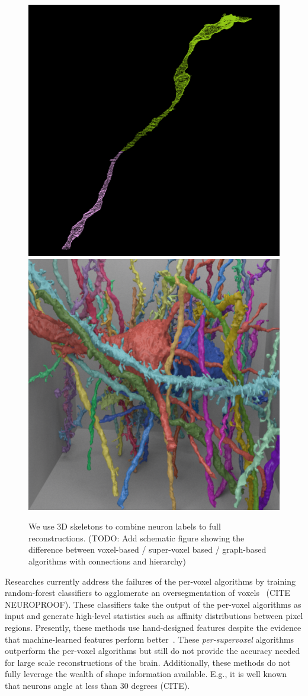 \begin{figure}
	\centering
	\includegraphics[width=0.42\linewidth]{./figures/merge_candidate1.png}
	\hspace{0.085\linewidth}
	\includegraphics[width=0.42\linewidth]{./figures/intro-cube.png}
	\caption{We use 3D skeletons to combine neuron labels to full reconstructions. (TODO: Add schematic figure showing the difference between voxel-based / super-voxel based / graph-based algorithms with connections and hierarchy)} %
\end{figure}

Researches currently address the failures of the per-voxel algorithms by training random-forest classifiers to agglomerate an oversegmentation of voxels~\cite{nunez2014graph} (CITE NEUROPROOF). 
These classifiers take the output of the per-voxel algorithms as input and generate high-level statistics such as affinity distributions between pixel regions. 
Presently, these methods use hand-designed features despite the evidence that machine-learned features perform better~\cite{bogovic2013learned}. 
These \textit{per-supervoxel} algorithms outperform the per-voxel algorithms but still do not provide the accuracy needed for large scale reconstructions of the brain.
Additionally, these methods do not fully leverage the wealth of shape information available.  E.g., it is well known that neurons angle at less than $30$ degrees (CITE). %


